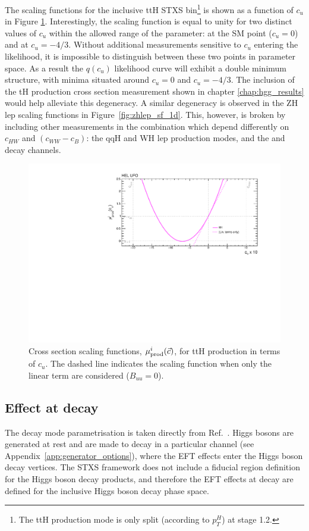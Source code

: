 The scaling functions for the inclusive ttH STXS bin\footnote{The ttH production mode is only split (according to $p_T^H$) at stage 1.2.} is shown as a function of $c_u$ in Figure \ref{fig:tth_sf_1d}. Interestingly, the scaling function is equal to unity for two distinct values of $c_u$ within the allowed range of the parameter: at the SM point ($c_u=0$) and at $c_u=-4/3$. Without additional measurements sensitive to $c_u$ entering the likelihood, it is impossible to distinguish between these two points in parameter space. As a result the $q(c_u)$ likelihood curve will exhibit a double minimum structure, with minima situated around $c_u=0$ and $c_u=-4/3$. The inclusion of the tH production cross section measurement shown in chapter \ref{chap:hgg_results} would help alleviate this degeneracy. A similar degeneracy is observed in the ZH lep scaling functions in Figure~\ref{fig:zhlep_sf_1d}. This, however, is broken by including other measurements in the combination which depend differently on $c_{HW}$ and $(c_{WW}-c_B)$: the qqH and WH lep production modes, and the \HZZ and \HWW decay channels.

\begin{figure}[htb!]
  \centering
  \includegraphics[width=.7\textwidth]{Figures/eft/scaling_functions/ttH_vs_cu.pdf}
  \caption[HEL cross section scaling function for ttH STXS bin]
  {
    Cross section scaling functions, $\mu_{\rm{prod}}^i(\vec{c})$, for ttH production in terms of $c_{u}$. The dashed line indicates the scaling function when only the linear term are considered ($B_{uu}=0$).
  }
  \label{fig:tth_sf_1d}
\end{figure}


\subsection{Effect at decay}
The decay mode parametrisation is taken directly from Ref.~\cite{Hays:2673969}. Higgs bosons are generated at rest and are made to decay in a particular channel (see Appendix~\ref{app:generator_options}), where the EFT effects enter the Higgs boson decay vertices. The STXS framework does not include a fiducial region definition for the Higgs boson decay products, and therefore the EFT effects at decay are defined for the inclusive Higgs boson decay phase space. 


